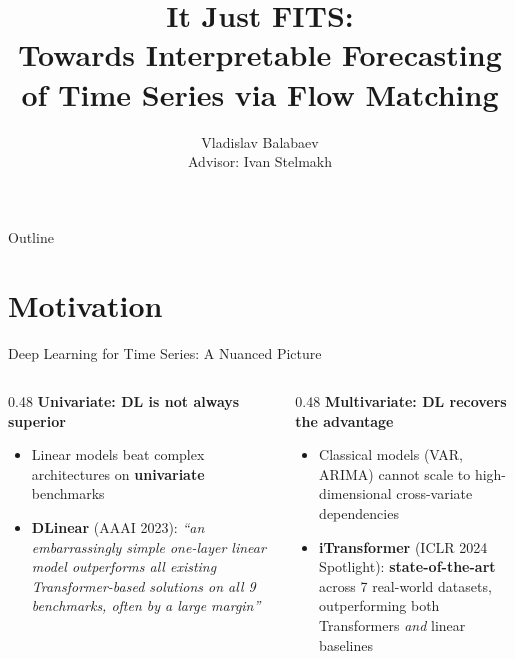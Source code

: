 \documentclass[aspectratio=169,11pt]{beamer}
\title[FITS]{It Just FITS:\\
Towards Interpretable Forecasting of Time Series via Flow Matching}
\author[V.\,Balabaev]{Vladislav Balabaev\\[4pt]
        {\small Advisor: Ivan Stelmakh}}
\institute[NES]{New Economic School}
\date{}
\begin{document}

\begin{frame}
  \titlepage
\end{frame}

\setcounter{tocdepth}{1}
\begin{frame}{Outline}
  \tableofcontents
\end{frame}

\section{Motivation}

\begin{frame}{Deep Learning for Time Series: A Nuanced Picture}

\begin{columns}[T]

\begin{column}{0.48\textwidth}
  \textbf{Univariate: DL is not always superior}
  \vspace{0.4em}
  \begin{itemize}
    \item Linear models beat complex architectures on
    \textbf{univariate} benchmarks
    \item \textbf{DLinear} (AAAI 2023): \textit{``an embarrassingly
    simple one-layer linear model outperforms all existing
    Transformer-based solutions on all 9 benchmarks, often by a
    large margin''} \citep{zeng2023transformers}
  \end{itemize}
\end{column}

\hfill

\begin{column}{0.48\textwidth}
  \textbf{Multivariate: DL recovers the advantage}
  \vspace{0.4em}
  \begin{itemize}
    \item Classical models (VAR, ARIMA) cannot scale to
    high-dimensional cross-variate dependencies
    \item \textbf{iTransformer} (ICLR 2024 Spotlight): \textbf{state-of-the-art} across
    7 real-world datasets, outperforming both Transformers
    \emph{and} linear baselines \citep{liu2024itransformer}
  \end{itemize}
\end{column}

\end{columns}

\end{frame}
\end{document}

